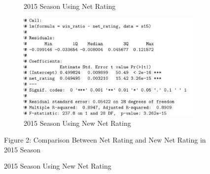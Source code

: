 \documentclass[11pt]{article}
\begin{document}
\begin{figure}[h!]
\begin{subfigure}[b]{0.42\linewidth}
    \caption{2015 Season Using Net Rating}
  \end{subfigure}
  \begin{subfigure}[b]{0.42\linewidth}
    \includegraphics[width=\linewidth]{new_nr_15_summary.jpg}
    \caption{2015 Season Using New Net Rating}
  \end{subfigure}

\bigskip

Figure 2: Comparison Between Net Rating and New Net Rating in 2015 Season
\end{figure}
\end{document}
